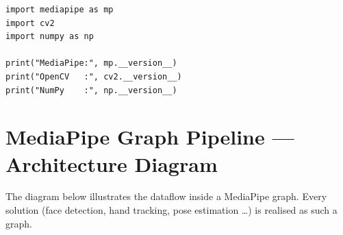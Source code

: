 \documentclass[12pt,a4paper]{article}
\begin{document}
\begin{lstlisting}[caption={Verify installation}]
import mediapipe as mp
import cv2
import numpy as np

print("MediaPipe:", mp.__version__)
print("OpenCV   :", cv2.__version__)
print("NumPy    :", np.__version__)
\end{lstlisting}

\section{MediaPipe Graph Pipeline --- Architecture Diagram}

The diagram below illustrates the dataflow inside a MediaPipe graph.
Every solution (face detection, hand tracking, pose estimation \ldots) is
realised as such a graph.

\bigskip
\end{document}
